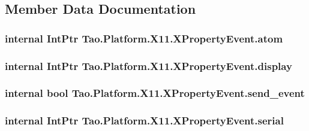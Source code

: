 \subsection{Member Data Documentation}
\hypertarget{struct_tao_1_1_platform_1_1_x11_1_1_x_property_event_a7e3ebaee82f66a484fe4d9f093c55b87}{
\subsubsection[{atom}]{\setlength{\rightskip}{0pt plus 5cm}internal IntPtr {\bf Tao.Platform.X11.XPropertyEvent.atom}}}
\label{struct_tao_1_1_platform_1_1_x11_1_1_x_property_event_a7e3ebaee82f66a484fe4d9f093c55b87}
\hypertarget{struct_tao_1_1_platform_1_1_x11_1_1_x_property_event_a2e8432d1b694417a2611377b6eded2eb}{
\subsubsection[{display}]{\setlength{\rightskip}{0pt plus 5cm}internal IntPtr {\bf Tao.Platform.X11.XPropertyEvent.display}}}
\label{struct_tao_1_1_platform_1_1_x11_1_1_x_property_event_a2e8432d1b694417a2611377b6eded2eb}
\hypertarget{struct_tao_1_1_platform_1_1_x11_1_1_x_property_event_a37ae29eb4ae48eca0a4dde13c1f32c10}{
\subsubsection[{send\_\-event}]{\setlength{\rightskip}{0pt plus 5cm}internal bool {\bf Tao.Platform.X11.XPropertyEvent.send\_\-event}}}
\label{struct_tao_1_1_platform_1_1_x11_1_1_x_property_event_a37ae29eb4ae48eca0a4dde13c1f32c10}
\hypertarget{struct_tao_1_1_platform_1_1_x11_1_1_x_property_event_a08e3b7fb79dd99c1bbd6d26691d3f30d}{
\subsubsection[{serial}]{\setlength{\rightskip}{0pt plus 5cm}internal IntPtr {\bf Tao.Platform.X11.XPropertyEvent.serial}}}
